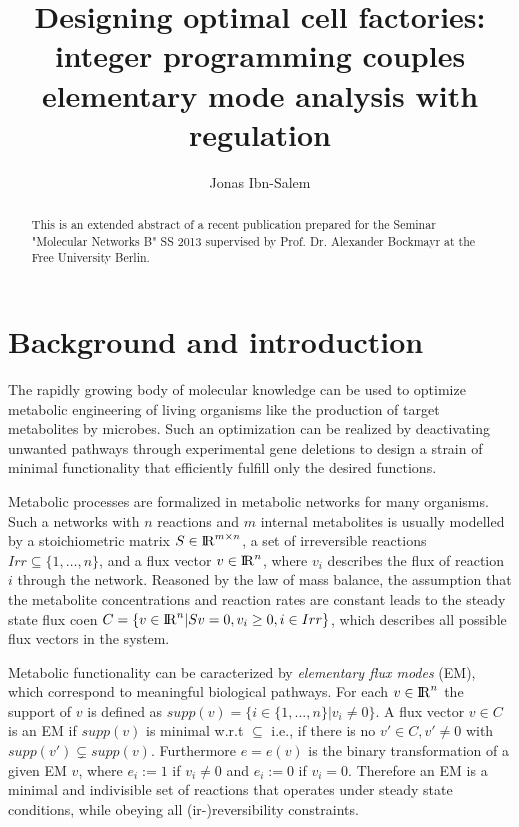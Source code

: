 \documentclass{llncs}
\title{Designing optimal cell factories:
integer programming couples elementary mode analysis with regulation}
\author{Jonas Ibn-Salem}
\institute{}%
\begin{document}
\maketitle

\begin{abstract}
This is an extended abstract of a recent publication \cite{Jungreuthmayer2012}
prepared for the Seminar "Molecular Networks B" SS 2013 supervised by 
Prof. Dr. Alexander Bockmayr at the Free University Berlin.
\end{abstract}
\section{Background and introduction}
The rapidly growing body of molecular knowledge can be used to optimize
metabolic engineering of living organisms 
like the production of target metabolites by microbes.
Such an optimization can be realized by deactivating unwanted pathways 
through experimental gene deletions to design a strain of minimal functionality 
that efficiently fulfill only the desired functions.
 
Metabolic processes are formalized in metabolic networks for many organisms.
Such a networks with $n$ reactions and $m$ internal metabolites
is usually modelled by a stoichiometric matrix $S \in {\rm I\!R}^{m\times n}$, 
a set of irreversible reactions $Irr \subseteq \{1, \dots, n \}$,
and a flux vector $v \in {\rm I\!R}^{n}$, where $v_{i}$ describes the flux of
reaction $i$ through the network. 
Reasoned by the law of mass balance, the assumption that the metabolite 
concentrations and reaction rates are constant leads to the steady state 
flux coen $C = \{v \in {\rm I\!R}^n | Sv = 0, v_i \geq 0, i \in Irr \}$,
which describes all possible flux vectors in the system.

Metabolic functionality can be caracterized by \emph{elementary flux modes} (EM), 
which correspond to meaningful biological pathways.
For each $v \in {\rm I\!R}^{n}$ the support of $v$ is defined as  
$supp(v) = \{i \in \{1, ..., n \} | v_i \neq 0  \}$.
A flux vector $v \in C$ is an EM if $supp(v)$
is minimal w.r.t $\subseteq$ i.e., if there is no $v' \in C, v' \neq 0$ 
with $supp(v') \subsetneq supp(v)$.  
Furthermore $e = e(v)$ is the binary transformation of a given EM $v$, where
$e_{i} := 1$ if $v_{i} \neq  0$ and $e_{i} := 0$ if $v_{i} = 0$.
Therefore an EM is a minimal and indivisible set 
of reactions that operates under steady state conditions, 
while obeying all (ir-)reversibility constraints.
\end{document}
